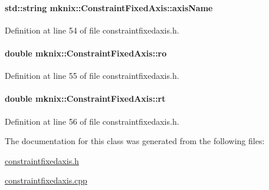 \paragraph[{axis\+Name}]{\setlength{\rightskip}{0pt plus 5cm}std\+::string mknix\+::\+Constraint\+Fixed\+Axis\+::axis\+Name\hspace{0.3cm}{\ttfamily [protected]}}\label{classmknix_1_1_constraint_fixed_axis_a71a1a8d7efc201a678dbfececa068ecb}


Definition at line 54 of file constraintfixedaxis.\+h.

\hypertarget{classmknix_1_1_constraint_fixed_axis_aaef8888c92c6fcba5d4644ab0cc8c984}{}
\paragraph[{ro}]{\setlength{\rightskip}{0pt plus 5cm}double mknix\+::\+Constraint\+Fixed\+Axis\+::ro\hspace{0.3cm}{\ttfamily [protected]}}\label{classmknix_1_1_constraint_fixed_axis_aaef8888c92c6fcba5d4644ab0cc8c984}


Definition at line 55 of file constraintfixedaxis.\+h.

\hypertarget{classmknix_1_1_constraint_fixed_axis_aae85721e0c2a16397b98fdb09ba72361}{}
\paragraph[{rt}]{\setlength{\rightskip}{0pt plus 5cm}double mknix\+::\+Constraint\+Fixed\+Axis\+::rt\hspace{0.3cm}{\ttfamily [protected]}}\label{classmknix_1_1_constraint_fixed_axis_aae85721e0c2a16397b98fdb09ba72361}


Definition at line 56 of file constraintfixedaxis.\+h.



The documentation for this class was generated from the following files\+:\begin{DoxyCompactItemize}
\item 
\hyperlink{constraintfixedaxis_8h}{constraintfixedaxis.\+h}\item 
\hyperlink{constraintfixedaxis_8cpp}{constraintfixedaxis.\+cpp}\end{DoxyCompactItemize}
